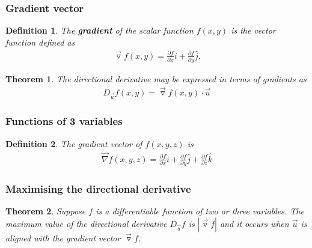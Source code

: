 \documentclass{article}
\theoremstyle{sltheorem}
\newtheorem{definition}{Definition}[section]
\newtheorem{theorem}{Theorem}[section]
\newcommand{\ih}{\widehat i}
\newcommand{\jh}{\widehat j}
\newcommand{\kh}{\widehat k}
\newcommand{\p}{\partial}
\newcommand{\grad}{\vec\triangledown}
\newcommand*\B[1]{\textbf{#1}}
\begin{document}
\subsubsection{Gradient vector}
\begin{definition}
    The \B{gradient} of the scalar function $f(x,y)$ is the vector
    function defined as
    \begin{align*}
        \grad f(x,y)=\frac{\p f}{\p x}\ih + \frac{\p f}{\p y}\jh.
    \end{align*}
\end{definition}
\begin{theorem}
    The directional derivative may be expressed in terms of gradients
    as 
    \begin{align*}
        D_{\vec u}f(x,y)=\grad f(x,y)\cdot \vec u
    \end{align*}
\end{theorem}
\subsubsection{Functions of 3 variables}
\begin{definition}
    The gradient vector of $f(x,y,z)$ is
    \begin{align*}
        \vec\nabla f(x,y,z)=\frac{\p f}{\p x}\ih + \frac{\p f}{\p y}\jh + \frac{\p f}{\p z}\kh
    \end{align*}
\end{definition}
\subsubsection{Maximising the directional derivative}
\begin{theorem}
    Suppose $f$ is a differentiable function of two or three variables.
    The maximum value of the directional derivative $D_{\vec u}f$ is
    $|\grad f|$ and it occurs when $\vec u$ is aligned with the gradient
    vector $\grad f$.
\end{theorem}
\end{document}

